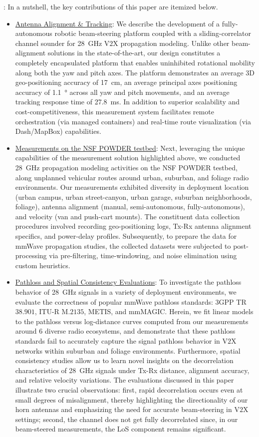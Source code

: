\documentclass[12pt, draftcls, onecolumn]{IEEEtran}
\begin{document}
: In a nutshell, the key contributions of this paper are itemized below.
\begin{itemize}[leftmargin=*]
    \item \underline{Antenna Alignment \& Tracking}: We describe the development of a fully-autonomous robotic beam-steering platform coupled with a sliding-correlator channel sounder for \SI{28}{\giga\hertz} V$2$X propagation modeling. Unlike other beam-alignment solutions in the state-of-the-art, our design constitutes a completely encapsulated platform that enables uninhibited rotational mobility along both the yaw and pitch axes. The platform demonstrates an average $3$D geo-positioning accuracy of \SI{17}{\centi\meter}, an average principal axes positioning accuracy of \SI{1.1}{\degree} across all yaw and pitch movements, and an average tracking response time of \SI{27.8}{\milli\second}. In addition to superior scalability and cost-competitiveness, this measurement system facilitates remote orchestration (via managed containers) and real-time route visualization (via Dash/MapBox) capabilities.
    \item \underline{Measurements on the NSF POWDER testbed}: Next, leveraging the unique capabilities of the measurement solution highlighted above, we conducted \SI{28}{\giga\hertz} propagation modeling activities on the NSF POWDER testbed, along unplanned vehicular routes around urban, suburban, and foliage radio environments. Our measurements exhibited diversity in deployment location (urban campus, urban street-canyon, urban garage, suburban neighborhoods, foliage), antenna alignment (manual, semi-autonomous, fully-autonomous), and velocity (van and push-cart mounts). The constituent data collection procedures involved recording geo-positioning logs, Tx-Rx antenna alignment specifics, and power-delay profiles. Subsequently, to prepare the data for mmWave propagation studies, the collected datasets were subjected to post-processing via pre-filtering, time-windowing, and noise elimination using custom heuristics.
    \item \underline{Pathloss and Spatial Consistency Evaluations}: To investigate the pathloss behavior of \SI{28}{\giga\hertz} signals in a variety of deployment environments, we evaluate the correctness of popular mmWave pathloss standards: $3$GPP TR$38.901$, ITU-R M$.2135$, METIS, and mmMAGIC. Herein, we fit linear models to the pathloss versus log-distance curves computed from our measurements around $6$ diverse radio ecosystems, and demonstrate that these pathloss standards fail to accurately capture the signal pathloss behavior in V$2$X networks within suburban and foliage environments. Furthermore, spatial consistency studies allow us to learn novel insights on the decorrelation characteristics of \SI{28}{\giga\hertz} signals under Tx-Rx distance, alignment accuracy, and relative velocity variations. The evaluations discussed in this paper illustrate two crucial observations: first, rapid decorrelation occurs even at small degrees of misalignment, thereby highlighting the directionality of our horn antennas and emphasizing the need for accurate beam-steering in V$2$X settings; second, the channel does not get fully decorrelated since, in our beam-steered measurements, the LoS component remains significant.

\end{itemize}
\end{document}
